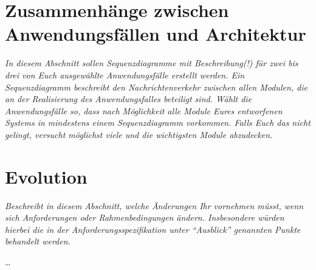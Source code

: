 \documentclass[enabledeprecatedfontcommands,fontsize=12pt,paper=a4,twoside]{scrartcl}
\begin{document}
\section[Zusammenhänge zwischen Anwendungsfällen und Architektur]{Zusammenhänge zwischen Anwendungsfällen und Architektur}
\label{sec:anwendungsfaelle}

{\it In diesem Abschnitt sollen Sequenzdiagramme mit Beschreibung(!)
  für zwei bis drei von Euch ausgewählte
    Anwendungsfälle
  erstellt werden. Ein Sequenzdiagramm beschreibt den
  Nachrichtenverkehr zwischen allen Modulen, die an der Realisierung
  des Anwendungsfalles beteiligt sind.  Wählt die
    Anwendungsfälle so, dass nach Möglichkeit alle Module Eures
    entworfenen Systems in mindestens einem Sequenzdiagramm
    vorkommen. Falls Euch das nicht gelingt, versucht möglichst viele
    und die wichtigsten Module abzudecken. }

\section{Evolution}

\label{sec:evolution}

{\it
  Beschreibt in diesem Abschnitt, welche Änderungen Ihr
  vornehmen müsst, wenn sich Anforderungen oder Rahmenbedingungen
  ändern. Insbesondere würden hierbei die in der
  Anforderungsspezifikation unter "`Ausblick"' genannten
  Punkte behandelt werden.}

\dots
\end{document}

